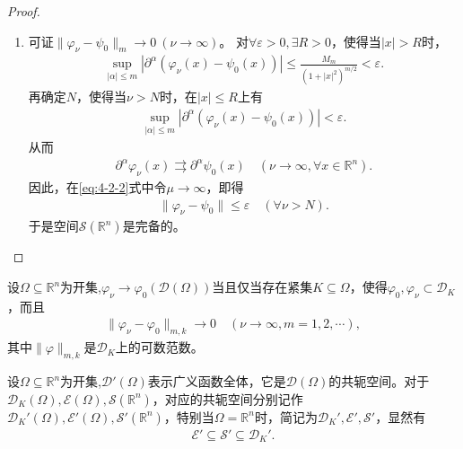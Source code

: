 \documentclass[../../main.tex]{subfiles}%
\begin{document}
\begin{proof}
\begin{enumerate}[(1)]
\item 可证$\|\varphi_\nu-\psi_0\|_m\to0\ (\nu\to\infty)$。
对$\forall\varepsilon>0,\exists R>0$，使得当$|x|>R$时，
\begin{align*}
\sup\limits_{|\alpha|\leqslant m}\left|\partial^\alpha(\varphi_\nu(x)-\psi_0(x))\right|\leqslant\frac{M_m}{(1+|x|^2)^{m/2}}<\varepsilon.
\end{align*}
再确定$N$，使得当$\nu>N$时，在$|x|\leqslant R$上有
\begin{align*}
\sup\limits_{|\alpha|\leqslant m}\left|\partial^\alpha(\varphi_\nu(x)-\psi_0(x))\right|<\varepsilon.
\end{align*}
从而
\begin{align*}
\partial^\alpha\varphi_\nu(x)\rightrightarrows\partial^\alpha\psi_0(x)\quad(\nu\to\infty,\forall x\in\mathbb{R}^n).
\end{align*}
因此，在\eqref{eq:4-2-2}式中令$\mu\to\infty$，即得
\begin{align*}
\|\varphi_\nu-\psi_0\|\leqslant\varepsilon\quad(\forall\nu>N).
\end{align*}
于是空间$\mathscr{S}(\mathbb{R}^n)$是完备的。
\end{enumerate}

\end{proof}

\begin{proposition}
设$\Omega\subseteq\mathbb{R}^n$为开集,$\varphi_\nu\to\varphi_0(\mathscr{D}(\Omega))$当且仅当存在紧集$K\subseteq\Omega$，使得$\varphi_0,\varphi_\nu\subset\mathscr{D}_K$，而且
\begin{align*}
\|\varphi_\nu-\varphi_0\|_{m,k}\to0\quad(\nu\to\infty,m=1,2,\cdots),
\end{align*}
其中$\|\varphi\|_{m,k}$是$\mathscr{D}_K$上的可数范数。
\end{proposition}

\begin{proposition}
设$\Omega\subseteq\mathbb{R}^n$为开集,$\mathscr{D}'(\Omega)$表示广义函数全体，它是$\mathscr{D}(\Omega)$的共轭空间。对于$\mathscr{D}_K(\Omega),\mathscr{E}(\Omega),\mathscr{S}(\mathbb{R}^n)$，对应的共轭空间分别记作$\mathscr{D}_K'(\Omega),\mathscr{E}'(\Omega),\mathscr{S}'(\mathbb{R}^n)$，特别当$\Omega=\mathbb{R}^n$时，简记为$\mathscr{D}_K',\mathscr{E}',\mathscr{S}'$，显然有
\begin{align*}
\mathscr{E}'\subseteq\mathscr{S}'\subseteq\mathscr{D}_K'.
\end{align*}

\end{proposition}
\end{document}
